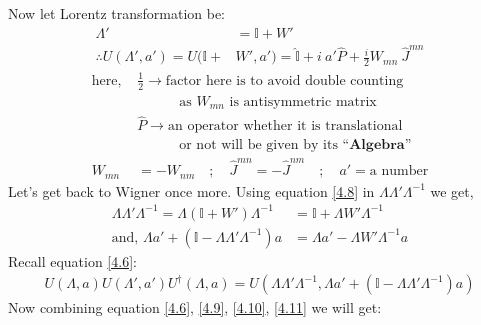 \documentclass[14pt]{article} %
\begin{document}
Now let Lorentz transformation be:
\begin{align*}
\Lambda' &= \mathbb{I}+W' \tag{4.8} \label{4.8} \\
\therefore U(\Lambda',a') = U(\mathbb{I}+& W',a') = \hat{\mathbb{I}} + i~a'\hat{P} + \frac{i}{2} W_{mn}~ \hat{J}^{mn} \tag{4.9} \label{4.9}
\end{align*}
\begin{align*}
\text{here, }&\frac{1}{2} \rightarrow\text{factor here is to avoid double counting}\\
&\quad \quad \quad \text{as } W_{mn} \text{ is antisymmetric matrix}\\
&\hat{P} \rightarrow \text{an operator whether it is translational}\\ &\quad \quad \quad\text{or not will be given by its } \textbf{``Algebra''} \\
W_{mn} &= -W_{nm} \quad;\quad \hat{J}^{mn} = -\hat{J}^{nm} \quad;\quad a' = \text{a number}
\end{align*}
Let's get back to Wigner once more. Using equation \eqref{4.8} in $\Lambda \Lambda' \Lambda^{-1}$ we get,
\begin{align*}
\Lambda \Lambda' \Lambda^{-1} = \Lambda (\mathbb{I}+W')\Lambda^{-1} &=\mathbb{I} + \Lambda W' \Lambda^{-1} \tag{4.10} \label{4.10}\\
\text{and, } \Lambda a'+(\mathbb{I}-\Lambda \Lambda' \Lambda^{-1})a &= \Lambda a' - \Lambda W' \Lambda^{-1}a \tag{4.11} \label{4.11}
\end{align*}
Recall equation \eqref{4.6}:
\begin{align*}
U(\Lambda, a) U(\Lambda', a') U^\dagger(\Lambda, a) = U(\Lambda \Lambda' \Lambda^{-1}, \Lambda a' + (\mathbb{I} - \Lambda \Lambda' \Lambda^{-1}) a) \tag{4.6} \label{4.6}
\end{align*}
Now combining equation \eqref{4.6}, \eqref{4.9}, \eqref{4.10}, \eqref{4.11} we will get:
\end{document}
